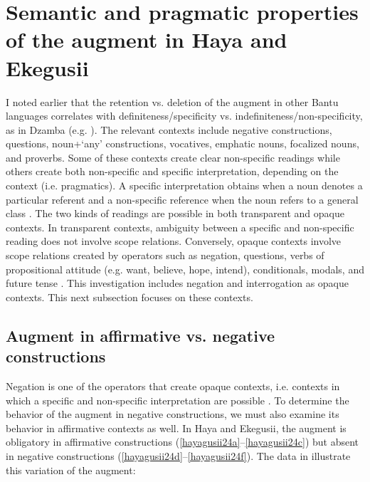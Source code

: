 \documentclass[output=paper]{langscibook}
\begin{document}
\section{Semantic and pragmatic properties of the augment in Haya and Ekegusii}\label{sec:choti:5}
I noted earlier that the retention vs. deletion of the augment in other Bantu languages correlates with definiteness/specificity vs. indefiniteness/non-specificity, as in Dzamba (e.g. \citealt{bokamba1971specificity}). The relevant contexts include negative constructions, questions, noun+`any’ constructions, vocatives, emphatic nouns, focalized nouns, and proverbs. Some of these contexts create clear non-specific readings while others create both non-specific and specific interpretation, depending on the context (i.e. pragmatics). A specific interpretation obtains when a noun denotes a particular referent and a non-specific reference when the noun refers to a general class \citep[§4]{lyons1999definiteness}. The two kinds of readings are possible in both transparent and opaque contexts. In transparent contexts, ambiguity between a specific and non-specific reading does not involve scope relations. Conversely, opaque contexts involve scope relations created by operators such as negation, questions, verbs of propositional attitude (e.g. want, believe, hope, intend), conditionals, modals, and future tense \citep[166--78]{lyons1999definiteness}. This investigation includes negation and interrogation as opaque contexts. This next subsection focuses on these contexts.

\subsection{Augment in affirmative vs. negative constructions}\label{sec:choti:5.1}
Negation is one of the operators that create opaque contexts, i.e. contexts in which a specific and non-specific interpretation are possible \citep{lyons1999definiteness}. To determine the behavior of the augment in negative constructions, we must also examine its behavior in affirmative contexts as well. In Haya and Ekegusii, the augment is obligatory in affirmative constructions (\ref{hayagusii24a}--\ref{hayagusii24c}) but absent in negative constructions (\ref{hayagusii24d}--\ref{hayagusii24f}). The data in  illustrate this variation of the augment:
\end{document}
